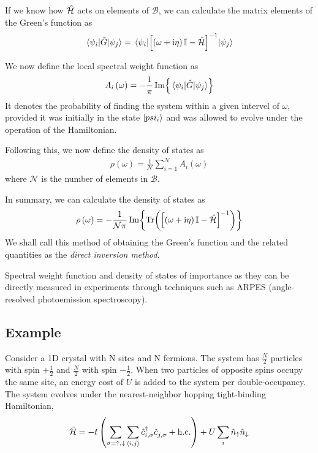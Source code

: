 	If we know how $ \hat{\mathcal{H}} $ acts on elements of $ \mathcal{B} $, we can calculate the matrix elements of the Green's function as
	\begin{align}
		\mel{\psi_i}{\hat{G}}{\psi_j} = \mel{\psi_i}{\left[ \left( \omega + \mathrm{i}\eta\right) \mathbb{I} - \hat{\mathcal{H}}\right]^{-1}}{\psi_j}
	\end{align}
	
	We now define the local spectral weight function as
	\begin{align}
		A_{i} \left( \omega \right) = -\frac{1}{\pi} \Im{ {\mel{\psi_i}{\hat{G}}{\psi_j}} }
	\end{align}
	It denotes the probability of finding the system within a given intervel of $ \omega $, provided it was initially in the state $ \ket{psi_i} $ and was allowed to evolve under the operation of the Hamiltonian.
	
	Following this, we now define the density of states as
	\begin{align}
		\rho \left( \omega \right) = \frac{1}{\mathcal{N}} \sum_{i = 1}^{\mathcal{N}} A_{i} \left( \omega \right)
	\end{align}
	where $ \mathcal{N} $ is the number of elements in $ \mathcal{B} $.
	
	In summary, we can calculate the density of states as
	\begin{align}
		\rho \left( \omega \right) = -\frac{1}{\mathcal{N \pi}} \Im{ \Tr( \left[ \left( \omega + \mathrm{i}\eta\right) \mathbb{I} - \hat{\mathcal{H}}\right]^{-1} ) }
	\end{align}
	We shall call this method of obtaining the Green's function and the related quantities as the \emph{direct inversion method}.
	
	Spectral weight function and density of states of importance as they can be directly measured in experiments through techniques such as ARPES (angle-resolved photoemission spectroscopy).
	
	\subsection*{Example}
		Consider a 1D crystal with N sites and N fermions. The system has $ \tfrac{N}{2} $ particles with spin $ +\tfrac{1}{2} $ and $ \tfrac{N}{2} $ with spin $ -\tfrac{1}{2} $. When two particles of opposite spins occupy the same site, an energy cost of $ U $ is added to the system per double-occupancy. The system evolves under the nearest-neighbor hopping tight-binding Hamiltonian,
		\begin{align}\label{eqn:tight-binding-hamil}
			\hat{\mathcal{H}} = -t \left(\sum_{\sigma = \uparrow, \downarrow} \sum_{\expval{i,j}} \hat{c}^{\dagger}_{i, \sigma} \hat{c}^{}_{j, \sigma} + \mathrm{h.c.} \right) + U \sum_{i}\hat{n}_{\uparrow} \hat{n}_{\downarrow}
		\end{align}
		
